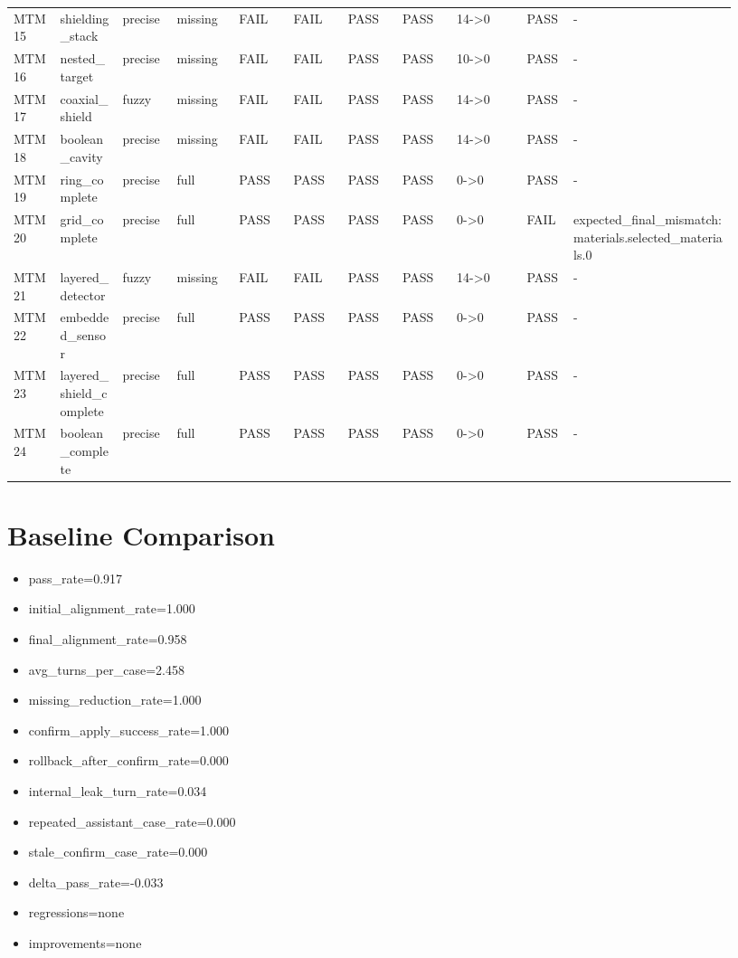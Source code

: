 \documentclass[11pt]{ctexart}
\begin{document}
\begin{longtable}{p{0.06\linewidth}p{0.08\linewidth}p{0.07\linewidth}p{0.08\linewidth}p{0.07\linewidth}p{0.07\linewidth}p{0.07\linewidth}p{0.07\linewidth}p{0.09\linewidth}p{0.06\linewidth}p{0.21\linewidth}}
MTM15 & shielding\_stack & precise & missing & FAIL & FAIL & PASS & PASS & 14->0 & PASS & - \\
MTM16 & nested\_target & precise & missing & FAIL & FAIL & PASS & PASS & 10->0 & PASS & - \\
MTM17 & coaxial\_shield & fuzzy & missing & FAIL & FAIL & PASS & PASS & 14->0 & PASS & - \\
MTM18 & boolean\_cavity & precise & missing & FAIL & FAIL & PASS & PASS & 14->0 & PASS & - \\
MTM19 & ring\_complete & precise & full & PASS & PASS & PASS & PASS & 0->0 & PASS & - \\
MTM20 & grid\_complete & precise & full & PASS & PASS & PASS & PASS & 0->0 & FAIL & expected\_final\_mismatch:materials.selected\_materials.0 \\
MTM21 & layered\_detector & fuzzy & missing & FAIL & FAIL & PASS & PASS & 14->0 & PASS & - \\
MTM22 & embedded\_sensor & precise & full & PASS & PASS & PASS & PASS & 0->0 & PASS & - \\
MTM23 & layered\_shield\_complete & precise & full & PASS & PASS & PASS & PASS & 0->0 & PASS & - \\
MTM24 & boolean\_complete & precise & full & PASS & PASS & PASS & PASS & 0->0 & PASS & - \\
\bottomrule
\end{longtable}
\section{Baseline Comparison}
\begin{itemize}
\item pass\_rate=0.917
\item initial\_alignment\_rate=1.000
\item final\_alignment\_rate=0.958
\item avg\_turns\_per\_case=2.458
\item missing\_reduction\_rate=1.000
\item confirm\_apply\_success\_rate=1.000
\item rollback\_after\_confirm\_rate=0.000
\item internal\_leak\_turn\_rate=0.034
\item repeated\_assistant\_case\_rate=0.000
\item stale\_confirm\_case\_rate=0.000
\item delta\_pass\_rate=-0.033
\item regressions=none
\item improvements=none
\end{itemize}
\appendix
\end{document}
